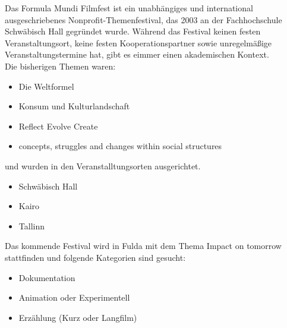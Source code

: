 Das Formula Mundi Filmfest ist ein unabhängiges und international ausgeschriebenes Nonprofit-Themenfestival, das 2003 an der Fachhochschule Schwäbisch Hall gegründet wurde. Während das Festival keinen festen Veranstaltungsort, keine festen Kooperationspartner sowie unregelmäßige Veranstaltungstermine hat, gibt es eimmer einen akademischen Kontext.\\

Die bisherigen Themen waren:
\begin{itemize}
  \item Die Weltformel
  \item Konsum und Kulturlandschaft
  \item Reflect Evolve Create
  \item concepts, struggles and changes within social structures
\end{itemize}

und wurden in den Veranstalltungsorten ausgerichtet.
\begin{itemize}
  \item Schwäbisch Hall
  \item Kairo
  \item Tallinn
\end{itemize}

Das kommende Festival wird in Fulda mit dem Thema \glqq{}Impact on tomorrow\grqq{} stattfinden und folgende Kategorien sind gesucht:

\begin{itemize}
  \item Dokumentation
  \item Animation oder Experimentell
  \item Erzählung (Kurz oder Langfilm)
\end{itemize}
